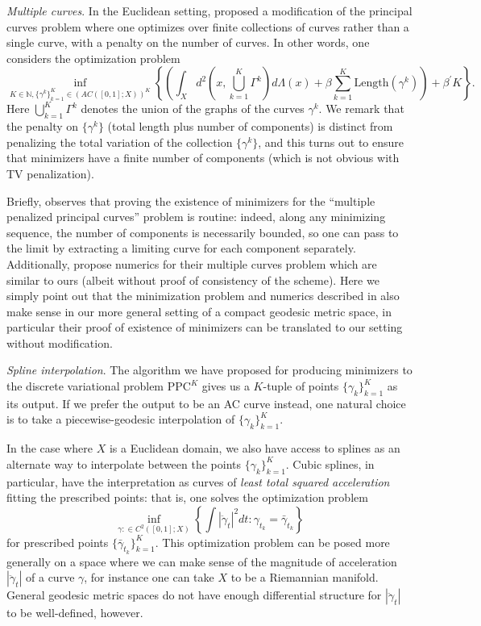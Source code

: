 \documentclass[aos, preprint]{imsart}
\theoremstyle{plain}
\theoremstyle{remark}
\begin{document}
\emph{Multiple curves}. In the Euclidean setting, \cite{kirov2017multiple}
proposed a modification of the principal curves problem where one
optimizes over finite collections of curves rather than a single curve,
with a penalty on the number of curves. In other words, one considers
the optimization problem
\[
\inf_{K\in\mathbb{N},\{\gamma^{k}\}_{k=1}^{K}\in(AC([0,1];X))^{K}}\left\{ \left(\int_{X}d^{2}\left(x,\bigcup_{k=1}^{K}\Gamma^{k}\right)d\Lambda(x)+\beta\sum_{k=1}^{K}\text{Length}(\gamma^{k})\right)+\beta^{\prime}K\right\} .
\]
Here $\bigcup_{k=1}^{K}\Gamma^{k}$ denotes the union of the graphs
of the curves $\gamma^{k}$. We remark that the penalty on $\{\gamma^{k}\}$
(total length plus number of components) is distinct from penalizing
the total variation of the collection $\{\gamma^{k}\}$, and this
turns out to ensure that minimizers have a finite number of components
(which is not obvious with TV penalization).

Briefly, \cite{kirov2017multiple} observes that proving the existence
of minimizers for the ``multiple penalized principal curves'' problem
is routine: indeed, along any minimizing sequence, the number of components
is necessarily bounded, so one can pass to the limit by extracting
a limiting curve for each component separately. Additionally, \cite{kirov2017multiple}
propose numerics for their multiple curves problem which are similar
to ours (albeit without proof of consistency of the scheme). Here
we simply point out that the minimization problem and numerics described
in \cite{kirov2017multiple} also make sense in our more general setting
of a compact geodesic metric space, in particular their proof of existence
of minimizers can be translated to our setting without modification.


\emph{Spline interpolation}.  The algorithm we have proposed for producing
minimizers to the discrete variational problem $\text{PPC}^{K}$ gives
us a $K$-tuple of points $\{\gamma_{k}\}_{k=1}^{K}$ as its output.
If we prefer the output to be an AC curve instead, one natural choice
is to take a piecewise-geodesic interpolation of $\{\gamma_{k}\}_{k=1}^{K}$.

In the case where $X$ is a Euclidean domain, we also have access
to splines as an alternate way to interpolate between the points $\{\gamma_{k}\}_{k=1}^{K}$.
Cubic splines, in particular, have the interpretation \cite{de1963best} as curves of \emph{least total squared acceleration} fitting the prescribed
points: that is, one solves the optimization problem
\[
\inf_{\gamma:\in C^{2}([0,1];X)}\left\{ \int|\ddot{\gamma}_{t}|^{2}dt:\gamma_{t_{k}}=\bar{\gamma}_{t_{k}}\right\}
\]
for prescribed points $\{\bar{\gamma}_{t_{k}}\}_{k=1}^{K}$. This
optimization problem can be posed more generally on a space where
we can make sense of the magnitude of acceleration $|\ddot{\gamma}_{t}|$
of a curve $\gamma$, for instance one can take $X$ to be a Riemannian
manifold. General geodesic metric spaces do not have enough differential
structure for $|\ddot{\gamma}_{t}|$ to be well-defined, however.
\end{document}
